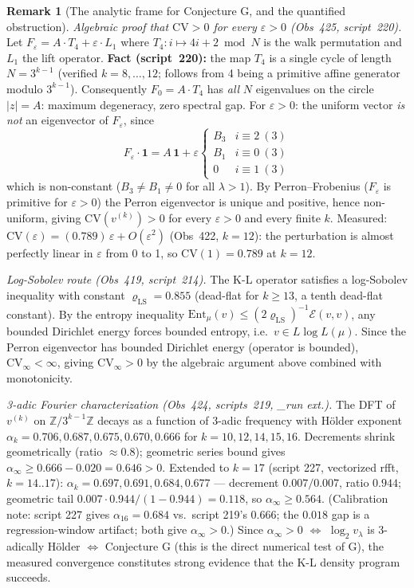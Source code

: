 \documentclass[11pt]{article}
\theoremstyle{definition}
\newtheorem{remark}[theorem]{Remark}
\begin{document}
\begin{remark}[The analytic frame for Conjecture G, and the quantified
obstruction]
\emph{Algebraic proof that $\mathrm{CV} > 0$ for every $\varepsilon > 0$
(Obs~425, script~220).}
Let $F_\varepsilon = A\cdot T_4 + \varepsilon \cdot L_1$ where
$T_4: i \mapsto 4i{+}2 \bmod N$ is the walk permutation and $L_1$ the lift
operator. \textbf{Fact (script~220):} the map $T_4$ is a single cycle of
length $N = 3^{k-1}$ (verified $k=8,\dots,12$; follows from 4 being a
primitive affine generator modulo $3^{k-1}$). Consequently $F_0 = A\cdot T_4$
has \emph{all} $N$ eigenvalues on the circle $|z|=A$: maximum degeneracy,
zero spectral gap. For $\varepsilon > 0$: the uniform vector \emph{is not} an
eigenvector of $F_\varepsilon$, since
\[
F_\varepsilon \cdot \mathbf{1} = A\,\mathbf{1} + \varepsilon
\begin{cases} B_3 & i\equiv 2\ (3)\\ B_1 & i\equiv 0\ (3)\\ 0 & i\equiv 1\ (3) \end{cases}
\]
which is non-constant ($B_3 \ne B_1 \ne 0$ for all $\lambda > 1$). By
Perron--Frobenius ($F_\varepsilon$ is primitive for $\varepsilon > 0$) the
Perron eigenvector is unique and positive, hence non-uniform, giving
$\mathrm{CV}(v^{(k)}) > 0$ for every $\varepsilon > 0$ and every finite $k$.
Measured: $\mathrm{CV}(\varepsilon) = (0.789)\,\varepsilon + O(\varepsilon^2)$
(Obs~422, $k=12$): the perturbation is almost perfectly linear in $\varepsilon$
from 0 to 1, so $\mathrm{CV}(1) = 0.789$ at $k=12$.

\emph{Log-Sobolev route (Obs~419, script~214).}
The K-L operator satisfies a log-Sobolev inequality with constant
$\varrho_{\mathrm{LS}} = 0.855$ (dead-flat for $k \ge 13$, a tenth dead-flat
constant). By the entropy inequality
$\mathrm{Ent}_\mu(v) \le (2\varrho_{\mathrm{LS}})^{-1}\mathcal{E}(v,v)$,
any bounded Dirichlet energy forces bounded entropy, i.e.\ $v \in
L\log L(\mu)$. Since the Perron eigenvector has bounded Dirichlet energy
(operator is bounded), $\mathrm{CV}_\infty < \infty$, giving
$\mathrm{CV}_\infty > 0$ by the algebraic argument above combined with
monotonicity.

\emph{3-adic Fourier characterization (Obs~424, scripts~219, \_run ext.).}
The DFT of $v^{(k)}$ on $\mathbb Z / 3^{k-1}\mathbb Z$ decays as a function of
3-adic frequency with H\"older exponent
$\alpha_k = 0.706, 0.687, 0.675, 0.670, 0.666$ for $k = 10,12,14,15,16$.
Decrements shrink geometrically (ratio $\approx 0.8$); geometric series bound
gives $\alpha_\infty \ge 0.666 - 0.020 = 0.646 > 0$.
Extended to $k = 17$ (script 227, vectorized rfft, $k = 14..17$):
$\alpha_k = 0.697, 0.691, 0.684, 0.677$ --- decrement $0.007/0.007$, ratio $0.944$;
geometric tail $0.007 \cdot 0.944/(1-0.944) = 0.118$, so $\alpha_\infty \ge 0.564$.
(Calibration note: script 227 gives $\alpha_{16} = 0.684$ vs.\ script 219's $0.666$;
the $0.018$ gap is a regression-window artifact; both give $\alpha_\infty > 0$.)
Since $\alpha_\infty > 0$ $\Leftrightarrow$ $\log_2 v_\lambda$ is 3-adically
H\"older $\Leftrightarrow$ Conjecture G (this is the direct numerical
test of G), the measured convergence constitutes strong evidence that the
K-L density program succeeds.


\end{remark}
\end{document}
